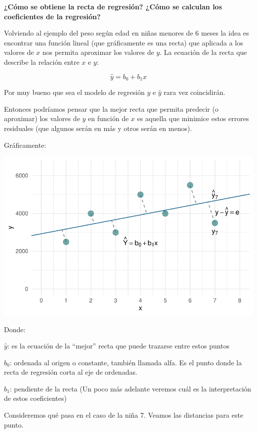 \documentclass[
  letterpaper,
  DIV=11,
  numbers=noendperiod]{scrartcl}
\begin{document}
\textbf{¿Cómo se obtiene la recta de regresión? ¿Cómo se calculan los
coeficientes de la regresión?}

Volviendo al ejemplo del peso según edad en niñas menores de 6 meses la
idea es encontrar una función lineal (que gráficamente es una recta) que
aplicada a los valores de \(x\) nos permita aproximar los valores de
\(y\). La ecuación de la recta que describe la relación entre \(x\) e
\(y\):

\[\hat{y} = b_0 + b_1x\]

Por muy bueno que sea el modelo de regresión \(y\) e \(\hat{y}\) rara
vez coincidirán.

Entonces podríamos pensar que la mejor recta que permita predecir (o
aproximar) los valores de \(y\) en función de \(x\) es aquella que
minimice estos errores residuales (que algunos serán en más y otros
serán en menos).

Gráficamente:

\begin{center}
\includegraphics{index_files/figure-pdf/unnamed-chunk-7-1.pdf}
\end{center}

Donde:

\(\hat{y}\): es la ecuación de la ``mejor'' recta que puede trazarse
entre estos puntos

\(b_0\): ordenada al origen o constante, también llamada alfa. Es el
punto donde la recta de regresión corta al eje de ordenadas.

\(b_1\): pendiente de la recta (Un poco más adelante veremos cuál es la
interpretación de estos coeficientes)

Consideremos qué pasa en el caso de la niña 7. Veamos las distancias
para este punto.
\end{document}
